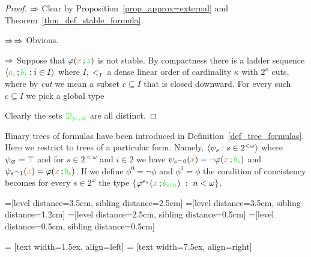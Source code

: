  \begin{proof}
 $\Rightarrow$ Clear by Proposition~\ref{prop_approx=external} and Theorem~\ref{thm_def_stable_formula}.
 
 $\Rightarrow$$\Rightarrow$ Obvious.
 
 $\Rightarrow$ Suppose that $\varphi({\color{brown} x}\,;{\color{green} z})$ is not stable.
 By compactness there is a ladder sequence  $\langle{\color{brown}a_i}\,;{\color{green} b_i} : i\in I\rangle$ where $I,<_I$ a dense linear order of cardinality $\kappa$ with $2^\kappa$ cuts, where by \textit{cut\/} we mean a subset $c\subseteq I$ that is closed downward.
 For every such $c\subseteq I$ we pick a global type
 
 
 Clearly the sets ${\color{green}\EuScript D_{p_c,\,\varphi} }$ are all distinct.
 \end{proof}


Binary trees of formulas have been introduced in Definition~\ref{def_tree_formulas}.
Here we restrict to trees of a particular form.
Namely, $\langle\psi_s:s\in 2^{<\omega}\rangle$  where $\psi_\varnothing=\top$ and for $s\in 2^{<\omega}$ and $i\in 2$ we have $\psi_{s^\frown 0}({\color{brown} x})=\neg\varphi({\color{brown} x}\,;{\color{green} b_s})$ and $\psi_{s^\frown 1}({\color{brown} x})=\varphi({\color{brown} x}\,;{\color{green} b_s})$.
If we define $\phi^0=\neg\phi$ and $\phi^1=\phi$ the condition of concistency becomes for every $s\in 2^\omega$ the type $\{\varphi^{s_n}({\color{brown} x}\,;{\color{green} b_{s\restriction n}})\ :\ n<\omega\}$.


=[level distance=3.5cm, sibling distance=2.5cm]
=[level distance=3.5cm, sibling distance=1.2cm]
=[level distance=2.5cm, sibling distance=0.5cm]
=[level distance=0.5cm, sibling distance=0.5cm]

 = [text width=1.5ex, align=left]
 = [text width=7.5ex, align=right]

\def\leaf{...}

